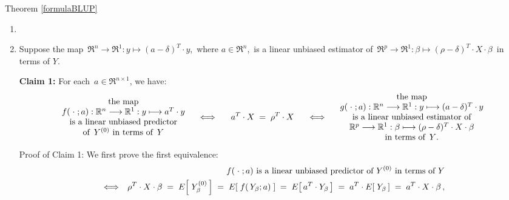 \proofof Theorem \ref{formulaBLUP}
\begin{enumerate}
\item
\item
	Suppose the map
	\,$\Re^{n} \longrightarrow \Re^{1} : y \longmapsto (a - \delta)^{T}\cdot y$,\,
	where $a \in \Re^{n}$,\, is a linear unbiased estimator of 
	\,$\Re^{p} \longrightarrow \Re^{1} : \beta \longmapsto (\rho - \delta)^{T} \cdot X \cdot \beta$\,
	in terms of $Y$.

	\vskip 0.3cm
	\noindent
	\textbf{Claim 1:}\quad
	For each \,$a \in \Re^{n \times 1}$, we have:
	\begin{equation*}
		\begin{array}{c}
		\textnormal{the map}
		\\
		f(\;\cdot\;;a) : \Re^{n} \longrightarrow \Re^{1} : y \longmapsto a^{T}\cdot y
		\\
		\textnormal{is a linear unbiased predictor}
		\\
		\textnormal{of \,$Y^{(0)}$ in terms of \,$Y$}
		\end{array}
	\quad\Longleftrightarrow\quad\;\;
		a^{T} \cdot X \; = \; \rho^{T} \cdot X
	\;\;\quad\Longleftrightarrow\quad
		\begin{array}{c}
		\textnormal{the map}
		\\
		g(\;\cdot\;;a) : \Re^{n} \longrightarrow \Re^{1} : y \longmapsto (a - \delta)^{T}\cdot y
		\\
		\textnormal{is a linear unbiased estimator of}
		\\
		\Re^{p} \longrightarrow \Re^{1} : \beta \longmapsto (\rho - \delta)^{T} \cdot X \cdot \beta
		\\
		\textnormal{in terms of \,$Y$.}
		\end{array}
	\end{equation*}
	\noindent
	Proof of Claim 1:\quad
	We first prove the first equivalence:
	\begin{eqnarray*}
	&&
		\textnormal{$f(\;\cdot\;;a)$ is a linear unbiased predictor of $Y^{(0)}$ in terms of $Y$}
	\\
	&\Longleftrightarrow&
		\rho^{T} \cdot X \cdot \beta
		\; = \;
			E\!\left[\;Y^{(0)}_{\beta}\,\right]
		\; = \;
			E\!\left[\;f(\,Y_{\beta};a)\;\right]
		\; = \;
			E\!\left[\,a^{T} \cdot Y_{\beta}\,\right]
		\; = \;
			a^{T} \cdot E\!\left[\;Y_{\beta}\,\right]
		\; = \;
			a^{T} \cdot X \cdot \beta\,,

\end{eqnarray*}
\end{enumerate}
